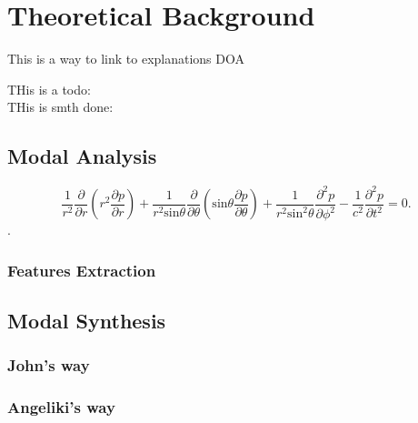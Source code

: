 \chapter{Theoretical Background}\label{ch:theory}
\mbox{}\par
This is a way to link to explanations \gls{DOA} 

THis is a todo: \\
THis is smth done:\\
\done{}
\section{Modal Analysis}\label{sec:modal_analysis}
\mbox{}\par

\begin{equation}\label{eq:spherical_wave}
 \frac{1}{r^2}\frac{\partial}{\partial r}(r^2 \frac{\partial p}{\partial r})+\frac{1}{r^2 \text{sin}\theta}\frac{\partial}{\partial \theta}(\text{sin}\theta\frac{\partial p}{\partial \theta}) + \frac{1}{r^2 \text{sin}^2\theta}\frac{\partial^2 p}{\partial \phi^2}-\frac{1}{c^2}\frac{\partial^2 p}{\partial t^2} = 0.
\end{equation}
 \cite{bib:fourierAcoustics}.
\subsection{Features Extraction}\label{sec:features_extraction}
\mbox{}\par
 
\section{Modal Synthesis}\label{sec:modal_synthesis}
\mbox{}\par 


\subsection{John's way}
\mbox{}\par
\subsection{Angeliki's way}
\mbox{}\par
